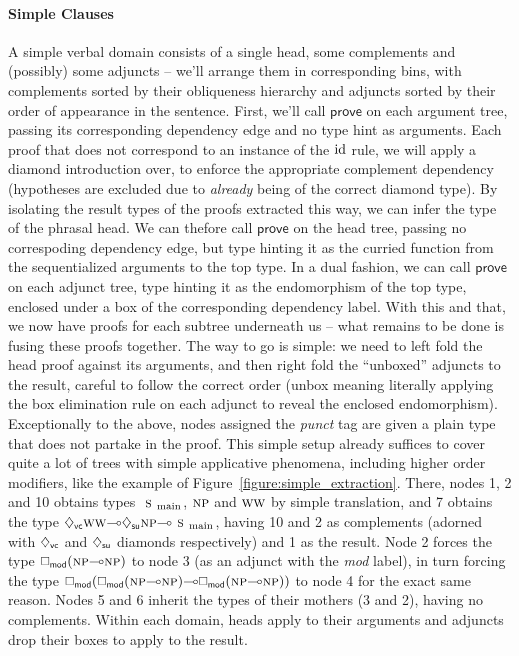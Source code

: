 \paragraph{Simple Clauses}
A simple verbal domain consists of a single head, some complements and (possibly) some adjuncts  -- we'll arrange them in corresponding bins, with complements sorted by their obliqueness hierarchy and adjuncts sorted by their order of appearance in the sentence.
First, we'll call $\mathsf{prove}$ on each argument tree, passing its corresponding dependency edge and no type hint as arguments.
Each proof that does not correspond to an instance of the $\mathrm{id}$ rule, we will apply a diamond introduction over, to enforce the appropriate complement dependency (hypotheses are excluded due to \textit{already} being of the correct diamond type).
By isolating the result types of the proofs extracted this way, we can infer the type of the phrasal head.
We can thefore call $\mathsf{prove}$ on the head tree, passing no correspoding dependency edge, but type hinting it as the curried function from the sequentialized arguments to the top type.
In a dual fashion, we can call $\mathsf{prove}$ on each adjunct tree, type hinting it as the endomorphism of the top type, enclosed under a box of the corresponding dependency label.
With this and that, we now have proofs for each subtree underneath us -- what remains to be done is fusing these proofs together.
The way to go is simple: we need to left fold the head proof against its arguments, and then right fold the ``unboxed'' adjuncts to the result, careful to follow the correct order (unbox meaning literally applying the box elimination rule on each adjunct to reveal the enclosed endomorphism).
Exceptionally to the above, nodes assigned the \textit{punct} tag are given a plain  type that does not partake in the proof.
This simple setup already suffices to cover quite a lot of trees with simple applicative phenomena, including higher order modifiers, like the example of Figure~\ref{figure:simple_extraction}.
There, nodes 1, 2 and 10 obtains types $\smain[s]$, $\np[s]$ and $\ww[s]$ by simple translation, and 7 obtains the type $\ddia{vc}\ww[s]\li\ddia{su}\np[s]\li\smain[s]$, having 10 and 2 as complements (adorned with $\ddia{vc}$ and $\ddia{su}$ diamonds respectively) and 1 as the result.
Node 2 forces the type $\dbox{mod}(\np[s]\li\np[s])$ to node 3 (as an adjunct with the \textit{mod} label), in turn forcing the type $\dbox{mod}(\dbox{mod}(\np[s]\li\np[s])\li\dbox{mod}(\np[s]\li\np[s]))$ to node 4 for the exact same reason. 
Nodes 5 and 6 inherit the types of their mothers (3 and 2), having no complements.
Within each domain, heads apply to their arguments and adjuncts drop their boxes to apply to the result.

